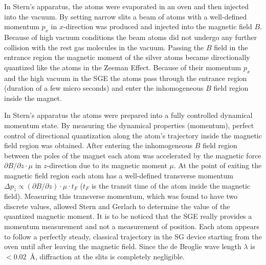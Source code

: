 \documentclass[12pt]{article}
\begin{document}
In Stern's apparatus, the atoms were evaporated in an oven and then injected into the vacuum. By setting narrow slits a beam of atoms with a well-defined momentum $p_x$ in $x$-direction was produced and injected into the magnetic field $B$. Because of high vacuum conditions the beam atoms did not undergo any further collision with the rest gas molecules in the vacuum. Passing the $B$ field in the entrance region the magnetic moment of the silver atoms became directionally quantized like the atoms in the Zeeman Effect. Because of their momentum $p_x$ and the high vacuum in the SGE the atoms pass through the entrance region (duration of a few micro seconds) and enter the inhomogeneous $B$ field region inside the magnet. 

In Stern's apparatus the atoms were prepared into a fully controlled dynamical momentum state. By measuring the dynamical properties (momentum), perfect control of directional quantization along the atom's trajectory inside the magnetic field region was obtained. After entering the inhomogeneous $B$ field region between the poles of the magnet each atom was accelerated by the magnetic force $\partial B/\partial z\cdot \mu$ in $z$-direction due to its magnetic moment $\mu$. At the point of exiting the magnetic field region each atom has a well-defined transverse momentum $\Delta p_z\propto (\partial B/\partial z) \cdot \mu \cdot t_F$ ($t_F$ is the transit time of the atom inside the magnetic field). Measuring this transverse momentum, which was found to have two discrete values, allowed Stern and Gerlach to determine the value of the quantized magnetic moment. It is to be noticed that the SGE really provides a momentum measurement and not a measurement of position.  Each atom appears to follow a perfectly steady, classical trajectory in the SG device starting from the oven until after leaving the magnetic field. Since the de Broglie wave length $\lambda$ is $< 0.02$~\AA, diffraction at the slits is completely negligible. 
\end{document}
